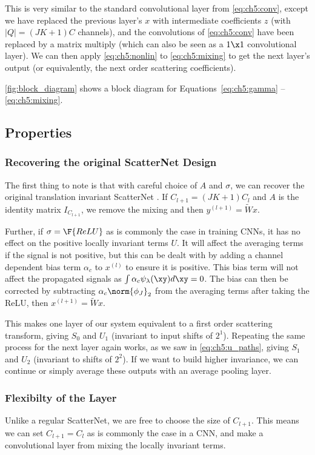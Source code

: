 This is very similar to the standard convolutional layer from
\autoref{eq:ch5:conv}, except we have replaced the previous layer's $x$ with
intermediate coefficients $z$ (with $|Q| = (JK+1)C$ channels), and the
convolutions of \autoref{eq:ch5:conv} have been replaced by a matrix multiply
(which can also be seen as a $1\x 1$ convolutional layer). We can then apply
\autoref{eq:ch5:nonlin} to \autoref{eq:ch5:mixing} to get the next layer's output (or
equivalently, the next order scattering coefficients).

\autoref{fig:block_diagram} shows a block diagram for
Equations~\ref{eq:ch5:gamma} -- \ref{eq:ch5:mixing}.


\subsection{Properties}
\subsubsection{Recovering the original ScatterNet Design}
The first thing to note is that with careful choice of $A$ and $\sigma$, we can
recover the original translation invariant ScatterNet
\cite{bruna_invariant_2013, oyallon_scaling_2017}. If $C_{l+1} = (JK+1)C_l$ 
and $A$ is the identity matrix $I_{C_{l+1}}$, we remove the mixing and then $y^{(l+1)} = \tilde{W}x$.

Further, if $\sigma = \F{ReLU}$ as is commonly the case in training CNNs, it has
no effect on the positive locally invariant terms $U$. It will affect the averaging terms
if the signal is not positive, but this can be dealt with by adding a channel
dependent bias term $\alpha_c$ to $x^{(l)}$ to ensure it is positive. This bias term
will not affect the propagated signals as $\int \alpha_c \psi_\lambda(\xy) d\xy =
0$. The bias can then be corrected by subtracting $\alpha_c \norm{\phi_J}_2$ from
the averaging terms after taking the ReLU, then $x^{(l+1)} = \tilde{W}x$.

This makes one layer of our system equivalent to a first order scattering
transform, giving $S_0$ and $U_1$ (invariant to input shifts of $2^1$). Repeating the
same process for the next layer again works, as we saw in \autoref{eq:ch5:u_paths},
giving $S_1$ and $U_2$ (invariant to shifts of $2^2$).  If we want to build
higher invariance, we can continue or simply average these outputs with an average pooling
layer.

\subsubsection{Flexibilty of the Layer}
Unlike a regular ScatterNet, we are free to choose the size of $C_{l+1}$. This
means we can set $C_{l+1} = C_{l}$ as is commonly the case in a CNN, and make a
convolutional layer from mixing the locally invariant terms. 

